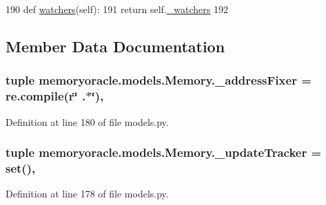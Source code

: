 \begin{DoxyCode}
190     \textcolor{keyword}{def }\hyperlink{classmemoryoracle_1_1models_1_1Memory_a03b88e9e9fd70efaaff14de07545d434}{watchers}(self):
191         \textcolor{keywordflow}{return} self.\hyperlink{classmemoryoracle_1_1models_1_1Memory_ab3ca0e2d38804d9d8efa0afc41a87853}{\_watchers}
192 
\end{DoxyCode}


\subsection{Member Data Documentation}
\hypertarget{classmemoryoracle_1_1models_1_1Memory_a3d2e26860fa2dd4191964ee8fbdf9167}{}
\subsubsection[{\+\_\+address\+Fixer}]{\setlength{\rightskip}{0pt plus 5cm}tuple memoryoracle.\+models.\+Memory.\+\_\+address\+Fixer = re.\+compile(r\char`\"{} .$\ast$\char`\"{})\hspace{0.3cm}{\ttfamily [static]}, {\ttfamily [private]}}\label{classmemoryoracle_1_1models_1_1Memory_a3d2e26860fa2dd4191964ee8fbdf9167}


Definition at line 180 of file models.\+py.

\hypertarget{classmemoryoracle_1_1models_1_1Memory_a40244e175057cde1390683264bcca44c}{}
\subsubsection[{\+\_\+update\+Tracker}]{\setlength{\rightskip}{0pt plus 5cm}tuple memoryoracle.\+models.\+Memory.\+\_\+update\+Tracker = set()\hspace{0.3cm}{\ttfamily [static]}, {\ttfamily [private]}}\label{classmemoryoracle_1_1models_1_1Memory_a40244e175057cde1390683264bcca44c}


Definition at line 178 of file models.\+py.

\hypertarget{classmemoryoracle_1_1models_1_1Memory_ab3ca0e2d38804d9d8efa0afc41a87853}{}
